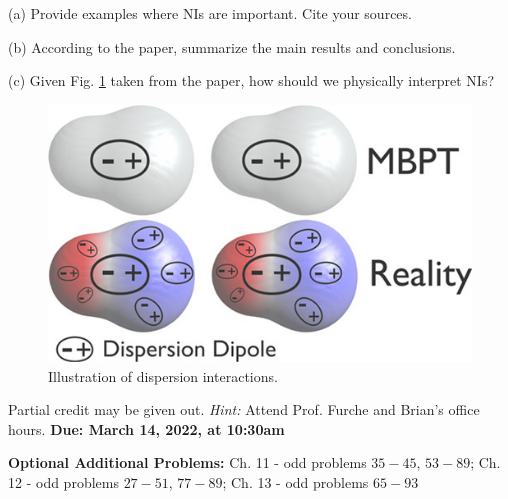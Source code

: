 \documentclass[11pt]{article}
\begin{document}
(a) Provide examples where NIs are important. Cite your sources.

(b) According to the paper, summarize the main results and conclusions.

(c) Given Fig. \ref{fig:nis} taken from the paper, how should we physically interpret NIs?
\begin{figure}[hbpt]
  \centering
  \includegraphics[scale=1.5]{dispersion.jpeg}
  \caption{Illustration of dispersion interactions.}
  \label{fig:nis}
\end{figure}

Partial credit may be given out. \textit{Hint:} Attend Prof. Furche and Brian's office hours.
\textbf{Due: March 14, 2022, at 10:30am}

\vfill
\textbf{Optional Additional Problems:} Ch. 11 - odd problems $35 - 45$,
$53 - 89$; Ch. 12 - odd problems $27 - 51$, $77 - 89$; Ch. 13 - odd problems $65 - 93$
\end{document}
